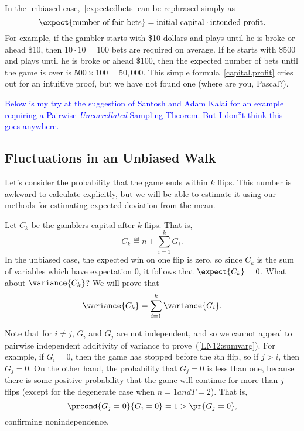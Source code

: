 In the unbiased case,~\eqref{expectedbets} can be rephrased simply as
\begin{equation}\label{capital.profit}
\expect{\text{number of fair bets}} = \text{initial capital}
\cdot \text{intended profit}.
\end{equation}
For example, if the gambler starts with \$10 dollars and plays until
he is broke or ahead \$10, then $10 \cdot 10 = 100$ bets are required
on average.  If he starts with \$500 and plays until he is broke or
ahead \$100, then the expected number of bets until the game is over
is $500 \times 100 = 50,000$.  This simple
formula~\eqref{capital.profit} cries out for an intuitive proof, but
we have not found one (where are you, Pascal?).

\iffalse

\textcolor{blue}{Below is my try at the suggestion of Santosh and Adam
  Kalai for an example requiring a Pairwise \emph{Uncorrellated}
  Sampling Theorem.  But I don''t think this goes anywhere.}

\subsection{Fluctuations in an Unbiased Walk}

Let's consider the probability that the game ends within $k$ flips.  This
number is awkward to calculate explicitly, but we will be able to estimate
it using our methods for estimating expected deviation from the mean.

Let $C_k$ be the gamblers capital after $k$ flips.  That is,
\[
C_k \eqdef n + \sum_{i=1}^k G_i.
\]
In the unbiased case, the expected win on one flip is zero, so since $C_k$
is the sum of variables which have expectation 0, it follows that
$\expect{C_k} = 0$.  What about $\variance{C_k}$?  We will prove that
\begin{equation}\label{LN12:sumvarg}
\variance{C_k} = \sum_{i=1}^k \variance{G_i}.
\end{equation}

Note that for $i \neq j$, $G_i$ and $G_j$ are not independent, and so we
cannot appeal to pairwise independent additivity of variance to
prove~(\ref{LN12:sumvarg}).  For example, if $G_i = 0$, then the game has
stopped before the $i$th flip, so if $j > i$, then $G_j = 0$.  On the
other hand, the probability that $G_j = 0$ is less than one, because there
is some positive probability that the game will continue for more than $j$
flips (except for the degenerate case when $n=1 and T=2$).  That is,
\[
\prcond{G_j = 0}{G_i = 0} = 1 > \pr{G_j = 0},
\]
confirming nonindependence.

